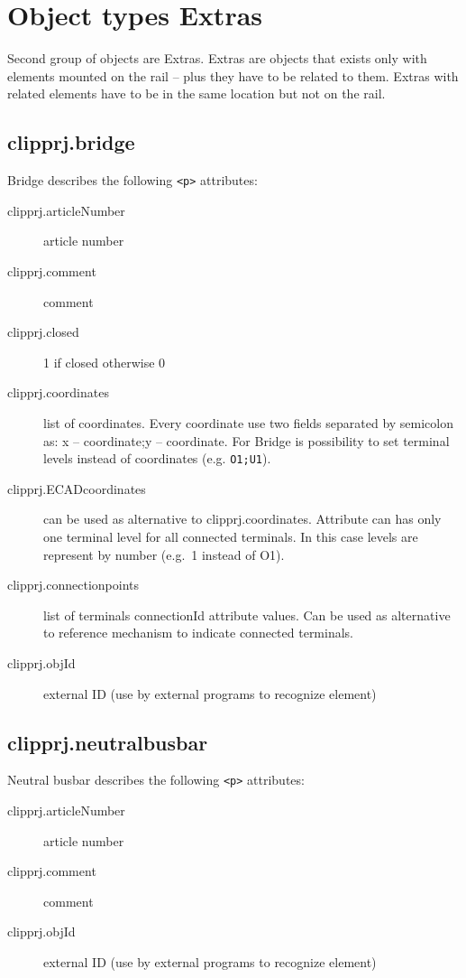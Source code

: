 \documentclass[%
	a4paper,
	oneside,
	listof=numbered,
	parskip=half,
	headsepline=true,
	footsepline=false,
	0.7headlines,
	]{scrbook}
\begin{document}
\section{Object types \glqq{}Extras\grqq{}} 
 
Second group of objects are Extras.
Extras are objects that exists only with elements mounted on the rail – plus they have to be related to them.
Extras with related elements have to be in the same location but not on the rail.

\subsection{clipprj.bridge}
 
Bridge describes the following \verb|<p>| attributes: 

\begin{description}
	\item[clipprj.articleNumber] article number 
	\item[clipprj.comment] comment 
	\item[clipprj.closed] 1 if closed otherwise 0 
	\item[clipprj.coordinates] list of coordinates.
	Every coordinate use two fields separated by semicolon as: x – coordinate;y – coordinate.
	For Bridge is possibility to set terminal levels instead of coordinates (e.g. \verb|O1;U1|).
	\item[clipprj.ECADcoordinates] can be used as alternative to clipprj.coordinates.
	Attribute can has only one terminal level for all connected terminals.
	In this case levels are represent by number (e.g.\ 1 instead of O1).
	\item[clipprj.connectionpoints] list of terminals connectionId attribute values.
	Can be used as alternative to reference mechanism to indicate connected terminals.
	\item[clipprj.objId] external ID (use by external programs to recognize element) 
\end{description}

\subsection{clipprj.neutralbusbar}
 
Neutral busbar describes the following \verb|<p>| attributes: 

\begin{description}
	\item[clipprj.articleNumber] article number 
	\item[clipprj.comment] comment 
	\item[clipprj.objId] external ID (use by external programs to recognize element) 
\end{description}
\end{document}
